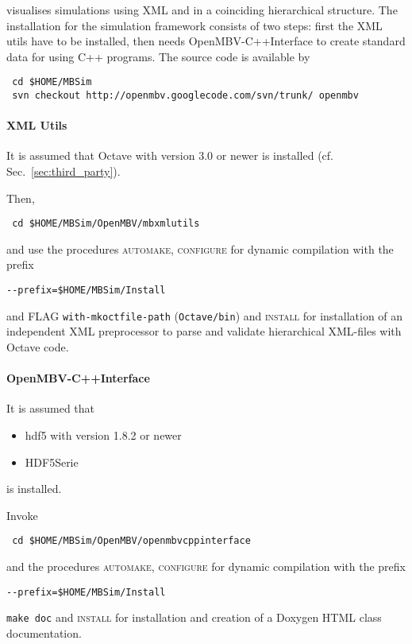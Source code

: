 \subsubsection{\OpenMBV{}}
\OpenMBV{} visualises \MBSim{} simulations using XML and \HDF{} in a coinciding hierarchical structure. The installation for the simulation framework consists of two steps: first the XML utils have to be installed, then \MBSim{} needs \textsf{OpenMBV-C++Interface} to create standard data for \OpenMBV{} using C++ programs. The source code is available by
\begin{verbatim}
 cd $HOME/MBSim
 svn checkout http://openmbv.googlecode.com/svn/trunk/ openmbv
\end{verbatim}

\paragraph{XML Utils}
It is assumed that Octave with version 3.0 or newer is installed (cf. Sec.~\ref{sec:third_party}).\par
Then,
\begin{verbatim}
 cd $HOME/MBSim/OpenMBV/mbxmlutils
\end{verbatim} 
and use the procedures \textsc{automake}, \textsc{configure} for dynamic compilation with the prefix
\begin{verbatim}
--prefix=$HOME/MBSim/Install
\end{verbatim}
and FLAG \texttt{\-\-with-mkoctfile-path} (\texttt{Octave/bin}) and \textsc{install} for installation of an independent XML preprocessor to parse and validate hierarchical XML-files with Octave code.

\paragraph{OpenMBV-C++Interface}
It is assumed that 
\begin{itemize}
\item hdf5 with version 1.8.2 or newer
\item HDF5Serie 
\end{itemize}
is installed.\par
Invoke
\begin{verbatim}
 cd $HOME/MBSim/OpenMBV/openmbvcppinterface
\end{verbatim} 
and the procedures \textsc{automake, configure} for dynamic compilation with the prefix
\begin{verbatim}
--prefix=$HOME/MBSim/Install
\end{verbatim}
\texttt{make doc} and \textsc{install} for installation and creation of a Doxygen HTML class documentation. 

